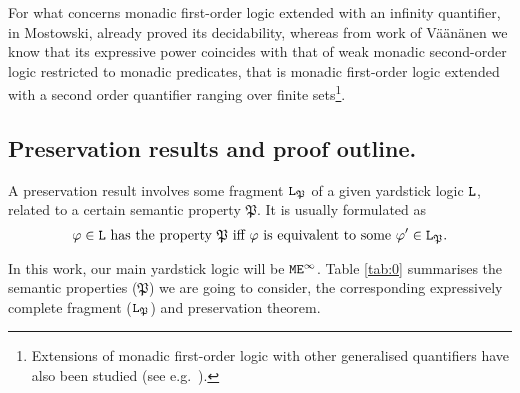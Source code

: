 For what concerns monadic first-order logic extended with an infinity quantifier,
in \cite{Mostowski1957} Mostowski, already proved its decidability, whereas from 
work of V\"a\"an\"anen  \cite{vaananen77} we know that its expressive power 
coincides with that of weak monadic second-order logic restricted to monadic 
predicates, that is monadic first-order logic extended with a second order 
quantifier ranging over finite sets\footnote{%
   Extensions of monadic first-order logic with other generalised quantifiers
   have also been studied (see 
   e.g.~\cite{slomson1968monadic,caicedo1981extensions}).
   }.


\subsection*{Preservation results and proof outline.}

A preservation result involves some fragment $\mathtt{L}_{\mathfrak{P}}$ of a given
yardstick logic $\mathtt{L}$, related to a certain semantic property $\mathfrak{P}$. 
It is usually formulated as
\begin{equation}\label{eq:intro-0}
\varphi  \in \mathtt{L} \text{ has the property } \mathfrak{P} \text{ iff } 
\varphi \text{ is equivalent to some } \varphi' \in \mathtt{L}_{\mathfrak{P}}.
\end{equation}

In this work, our main yardstick logic will be $\mathtt{M}\mathtt{E}^{\infty}$. 
Table \ref{tab:0} summarises the semantic properties
($\mathfrak{P}$) we are going to consider,  
the corresponding expressively complete fragment ($\mathtt{L}_{\mathfrak{P}}$) and preservation theorem.

